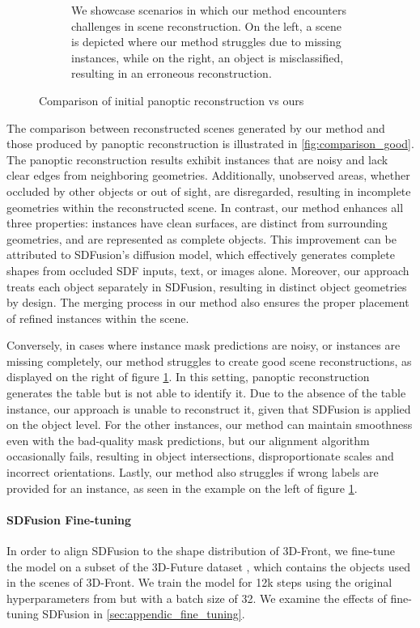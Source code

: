 \begin{figure}
\begin{subfigure}[t]{56mm}
    \caption{We showcase scenarios in which our method encounters challenges in scene reconstruction. On the left, a scene is depicted where our method struggles due to missing instances, while on the right, an object is misclassified, resulting in an erroneous reconstruction.}\label{fig:comparison_bad}
  \end{subfigure}
  \caption{Comparison of initial panoptic reconstruction \citep{dahnert2021panoptic} vs ours}
  \label{fig:comparison_all}
\end{figure}


The comparison between reconstructed scenes generated by our method and those produced by panoptic reconstruction is illustrated in \ref{fig:comparison_good}.
The panoptic reconstruction results exhibit instances that are noisy and lack clear edges from neighboring geometries.
Additionally, unobserved areas, whether occluded by other objects or out of sight, are disregarded, resulting in incomplete geometries within the reconstructed scene.
In contrast, our method enhances all three properties: instances have clean surfaces, are distinct from surrounding geometries, and are represented as complete objects.
This improvement can be attributed to SDFusion's diffusion model, which effectively generates complete shapes from occluded SDF inputs, text, or images alone.
Moreover, our approach treats each object separately in SDFusion, resulting in distinct object geometries by design. The merging process in our method also ensures the proper placement of refined instances within the scene.

Conversely, in cases where instance mask predictions are noisy, or instances are missing completely, our method struggles to create good scene reconstructions, as displayed on the right of figure \ref{fig:comparison_bad}. In this setting, panoptic reconstruction generates the table but is not able to identify it. Due to the absence of the table instance, our approach is unable to reconstruct it, given that SDFusion is applied on the object level. For the other instances, our method can maintain smoothness even with the bad-quality mask predictions, but our alignment algorithm occasionally fails, resulting in object intersections, disproportionate scales and incorrect orientations. Lastly, our method also struggles if wrong labels are provided for an instance, as seen in the example on the left of figure \ref{fig:comparison_bad}.

\paragraph{SDFusion Fine-tuning}

In order to align SDFusion to the shape distribution of 3D-Front, we fine-tune the model on a subset of the 3D-Future dataset \citep{fu20213e}, which contains the objects used in the scenes of 3D-Front.
We train the model for 12k steps using the original hyperparameters from \citet{cheng2023sdfusion} but with a batch size of 32. We examine the effects of fine-tuning SDFusion in \ref{sec:appendic_fine_tuning}.
